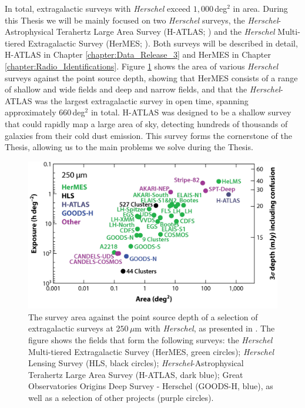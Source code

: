 In total, extragalactic surveys with \textit{Herschel} exceed $1,000\,$deg$^2$ in area. During this Thesis we will be mainly focused on two \textit{Herschel} surveys, the \textit{Herschel}-Astrophysical Terahertz Large Area Survey (H-ATLAS; \citealt{Eales_2010}) and the \textit{Herschel} Multi-tiered Extragalactic Survey (HerMES; \citealt{Oliver_2012}). Both surveys will be described in detail, H-ATLAS in Chapter \ref{chapter:Data_Release_3} and HerMES in Chapter \ref{chapter:Radio_Identifications}. Figure \ref{fig:herschel_surveys} shows the area of various \textit{Herschel} surveys against the point source depth, showing that HerMES consists of a range of shallow and wide fields and deep and narrow fields, and that the \textit{Herschel}-ATLAS was the largest extragalactic survey in open time, spanning approximately $660\,$deg$^2$ in total. H-ATLAS was designed to be a shallow survey that could rapidly map a large area of sky, detecting hundreds of thousands of galaxies from their cold dust emission. This survey forms the cornerstone of the Thesis, allowing us to {\color{red}the main problems we solve during the Thesis}.

\begin{figure}
    \centering
	\includegraphics[width=0.9\columnwidth]{Figures/herschel_surveys.pdf}
	\caption[Survey area against point source depth for extragalactic \textit{Herschel} surveys]{The survey area against the point source depth of a selection of extragalactic surveys at $250\,\mu$m with \textit{Herschel}, as presented in \citealt{Lutz_2014}. The figure shows the fields that form the following surveys: the \textit{Herschel} Multi-tiered Extragalactic Survey (HerMES, green circles); \textit{Herschel} Lensing Survey (HLS, black circles); \textit{Herschel}-Astrophysical Terahertz Large Area Survey (H-ATLAS, dark blue); Great Observatories Origins Deep Survey - Herschel (GOODS-H, blue), as well as a selection of other projects (purple circles).}
	\label{fig:herschel_surveys}
\end{figure}

